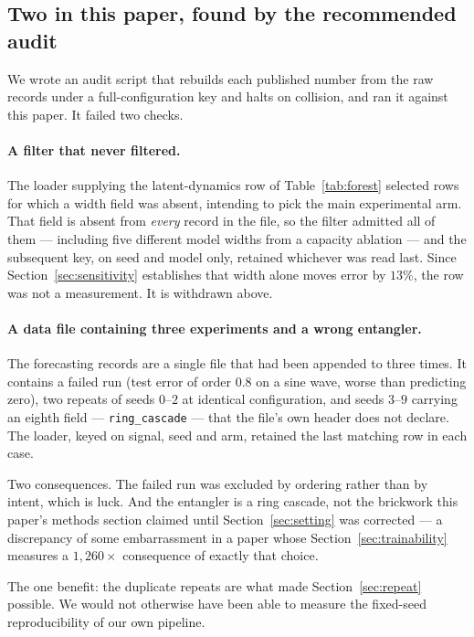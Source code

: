 \documentclass[11pt,onecolumn]{article}
\begin{document}
\subsection{Two in this paper, found by the recommended audit}
\label{sec:selfaudit}
We wrote an audit script that rebuilds each published number from the
raw records under a full-configuration key and halts on collision, and
ran it against this paper. It failed two checks.

\paragraph{A filter that never filtered.}
The loader supplying the latent-dynamics row of Table~\ref{tab:forest}
selected rows for which a width field was absent, intending to pick the
main experimental arm. That field is absent from \emph{every} record in
the file, so the filter admitted all of them --- including five
different model widths from a capacity ablation --- and the subsequent
key, on seed and model only, retained whichever was read last. Since
Section~\ref{sec:sensitivity} establishes that width alone moves error
by $13\%$, the row was not a measurement. It is withdrawn above.

\paragraph{A data file containing three experiments and a wrong
entangler.}
The forecasting records are a single file that had been appended to
three times. It contains a failed run (test error of order $0.8$ on a
sine wave, worse than predicting zero), two repeats of seeds $0$--$2$ at
identical configuration, and seeds $3$--$9$ carrying an eighth field
--- \texttt{ring\_cascade} --- that the file's own header does not
declare. The loader, keyed on signal, seed and arm, retained the last
matching row in each case.

Two consequences. The failed run was excluded by ordering rather than by
intent, which is luck. And the entangler is a ring cascade, not the
brickwork this paper's methods section claimed until
Section~\ref{sec:setting} was corrected --- a discrepancy of some
embarrassment in a paper whose Section~\ref{sec:trainability} measures a
$1{,}260\times$ consequence of exactly that choice.

The one benefit: the duplicate repeats are what made
Section~\ref{sec:repeat} possible. We would not otherwise have been able
to measure the fixed-seed reproducibility of our own pipeline.
\end{document}
